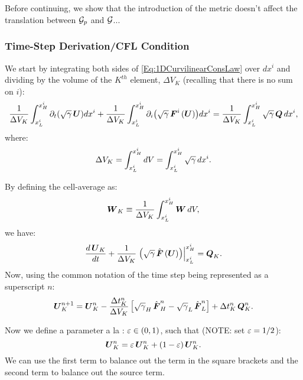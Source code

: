 Before continuing, we show that the introduction of the metric doesn't affect the translation between $\cG_{p}$ and $\cG$...

\subsubsection{Time-Step Derivation/CFL Condition}
We start by integrating both sides of \eqref{Eq:1DCurvilinearConsLaw} over $dx^{i}$ and dividing by the volume of the $K^{th}$ element, $\Delta V_{K}$ (recalling that there is no sum on $i$):
\begin{equation}
    \f{1}{\Delta V_{K}}\int_{x^{i}_{L}}^{x^{i}_{H}}\pd{\left(\sqrtgm\,\bU\right)}{t}dx^{i}+\f{1}{\Delta V_{K}}\int_{x^{i}_{L}}^{x^{i}_{H}}\pd{\left(\sqrtgm\,\bF^{i}\left(\bU\right)\right)}{i}dx^{i}=\f{1}{\Delta V_{K}}\int_{x^{i}_{L}}^{x^{i}_{H}}\sqrtgm\,\bQ\,dx^{i},
\end{equation}
where:
\begin{equation}
    \Delta V_{K}=\int_{x^{i}_{L}}^{x^{i}_{H}}dV=\int_{x^{i}_{L}}^{x^{i}_{H}}\sqrtgm\,dx^{i}.
\end{equation}

By defining the cell-average as:
\begin{equation}
    \bW_{K}\equiv\f{1}{\Delta V_{K}}\int_{x^{i}_{L}}^{x^{i}_{H}}\bW\,dV,
\end{equation}
we have:
\begin{equation}
    \f{d\,\bU_{K}}{dt}+\f{1}{\Delta V_{K}}\left.\left(\sqrtgm\,\hat{\bF}\left(\bU\right)\right)\right|^{x^{i}_{H}}_{x^{i}_{L}}=\bQ_{K}.
\end{equation}
Now, using the common notation of the time step being represented as a superscript $n$:
\begin{equation}
    \bU^{n+1}_{K}=\bU^{n}_{K}-\f{\Delta t^{n}_{K}}{\Delta V_{K}}\left[\sqrtgm_{H}\,\hat{\bF}^{n}_{H}-\sqrtgm_{L}\,\hat{\bF}^{n}_{L}\right]+\Delta t^{n}_{K}\,\bQ^{n}_{K}.
\end{equation}

Now we define a parameter a la \citet{ZS2011b}: $\ve\in\left(0,1\right)$, such that (NOTE: \citet{ZS2011b} set $\ve=1/2$):
\begin{equation}
    \bU^{n}_{K}=\ve\,\bU^{n}_{K}+\left(1-\ve\right)\bU^{n}_{K}.
\end{equation}
We can use the first term to balance out the term in the square brackets and the second term to balance out the source term.

